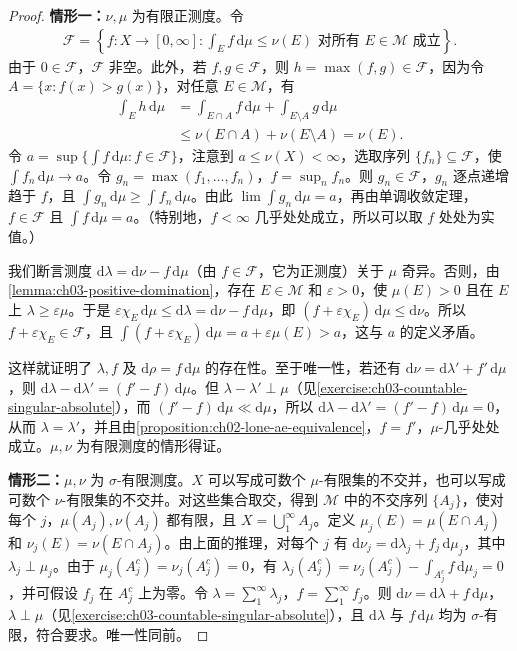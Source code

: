 \documentclass[../../main.tex]{subfiles}%
\begin{document}
\begin{proof}
\textbf{情形一：}$\nu,\mu$ 为有限正测度。令
\begin{align*}
\mathscr{F}=\left\{f:X\to[0,\infty]:\int_E f\,\mathrm{d}\mu\le\nu(E)\text{ 对所有 }E\in\mathscr{M}\text{ 成立}\right\}.
\end{align*}
由于 $0\in\mathscr{F}$，$\mathscr{F}$ 非空。此外，若 $f,g\in\mathscr{F}$，则 $h=\max(f,g)\in\mathscr{F}$，因为令 $A=\{x:f(x)>g(x)\}$，对任意 $E\in\mathscr{M}$，有
\begin{align*}
\int_E h\,\mathrm{d}\mu
&=\int_{E\cap A}f\,\mathrm{d}\mu+\int_{E\setminus A}g\,\mathrm{d}\mu\\
&\le\nu(E\cap A)+\nu(E\setminus A)=\nu(E).
\end{align*}
令 $a=\sup\{\int f\,\mathrm{d}\mu:f\in\mathscr{F}\}$，注意到 $a\le\nu(X)<\infty$，选取序列 $\{f_n\}\subseteq\mathscr{F}$，使 $\int f_n\,\mathrm{d}\mu\to a$。令 $g_n=\max(f_1,\ldots,f_n)$，$f=\sup_n f_n$。则 $g_n\in\mathscr{F}$，$g_n$ 逐点递增趋于 $f$，且 $\int g_n\,\mathrm{d}\mu\ge\int f_n\,\mathrm{d}\mu$。由此 $\lim\int g_n\,\mathrm{d}\mu=a$，再由单调收敛定理，$f\in\mathscr{F}$ 且 $\int f\,\mathrm{d}\mu=a$。（特别地，$f<\infty$ 几乎处处成立，所以可以取 $f$ 处处为实值。）

我们断言测度 $\mathrm{d}\lambda=\mathrm{d}\nu-f\,\mathrm{d}\mu$（由 $f\in\mathscr{F}$，它为正测度）关于 $\mu$ 奇异。否则，由\cref{lemma:ch03-positive-domination}，存在 $E\in\mathscr{M}$ 和 $\varepsilon>0$，使 $\mu(E)>0$ 且在 $E$ 上 $\lambda\ge\varepsilon\mu$。于是 $\varepsilon\chi_E\,\mathrm{d}\mu\le\mathrm{d}\lambda=\mathrm{d}\nu-f\,\mathrm{d}\mu$，即 $(f+\varepsilon\chi_E)\,\mathrm{d}\mu\le\mathrm{d}\nu$。所以 $f+\varepsilon\chi_E\in\mathscr{F}$，且 $\int(f+\varepsilon\chi_E)\,\mathrm{d}\mu=a+\varepsilon\mu(E)>a$，这与 $a$ 的定义矛盾。

这样就证明了 $\lambda,f$ 及 $\mathrm{d}\rho=f\,\mathrm{d}\mu$ 的存在性。至于唯一性，若还有 $\mathrm{d}\nu=\mathrm{d}\lambda'+f'\,\mathrm{d}\mu$，则 $\mathrm{d}\lambda-\mathrm{d}\lambda'=(f'-f)\,\mathrm{d}\mu$。但 $\lambda-\lambda'\perp\mu$（见\cref{exercise:ch03-countable-singular-absolute}），而 $(f'-f)\,\mathrm{d}\mu\ll\mathrm{d}\mu$，所以 $\mathrm{d}\lambda-\mathrm{d}\lambda'=(f'-f)\,\mathrm{d}\mu=0$，从而 $\lambda=\lambda'$，并且由\cref{proposition:ch02-lone-ae-equivalence}，$f=f'$，$\mu$-几乎处处成立。$\mu,\nu$ 为有限测度的情形得证。

\textbf{情形二：}$\mu,\nu$ 为 $\sigma$-有限测度。$X$ 可以写成可数个 $\mu$-有限集的不交并，也可以写成可数个 $\nu$-有限集的不交并。对这些集合取交，得到 $\mathscr{M}$ 中的不交序列 $\{A_j\}$，使对每个 $j$，$\mu(A_j),\nu(A_j)$ 都有限，且 $X=\bigcup_1^\infty A_j$。定义 $\mu_j(E)=\mu(E\cap A_j)$ 和 $\nu_j(E)=\nu(E\cap A_j)$。由上面的推理，对每个 $j$ 有 $\mathrm{d}\nu_j=\mathrm{d}\lambda_j+f_j\,\mathrm{d}\mu_j$，其中 $\lambda_j\perp\mu_j$。由于 $\mu_j(A_j^c)=\nu_j(A_j^c)=0$，有 $\lambda_j(A_j^c)=\nu_j(A_j^c)-\int_{A_j^c}f\,\mathrm{d}\mu_j=0$，并可假设 $f_j$ 在 $A_j^c$ 上为零。令 $\lambda=\sum_1^\infty\lambda_j$，$f=\sum_1^\infty f_j$。则 $\mathrm{d}\nu=\mathrm{d}\lambda+f\,\mathrm{d}\mu$，$\lambda\perp\mu$（见\cref{exercise:ch03-countable-singular-absolute}），且 $\mathrm{d}\lambda$ 与 $f\,\mathrm{d}\mu$ 均为 $\sigma$-有限，符合要求。唯一性同前。


\end{proof}
\end{document}
